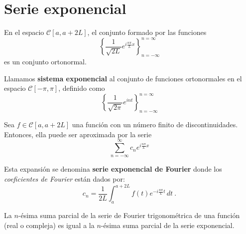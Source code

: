 \section{Serie exponencial}

\begin{propo}
    En el espacio $\mathscr{C}[a,a+2L]$, el conjunto formado por las funciones 
    \begin{equation}
        \left\{ \frac{1}{\sqrt{2L}} e^{i\frac{n\pi}{L}x} \right\}_{n= - \infty}^{n = \infty}
    \end{equation}
    es un conjunto ortonormal.
\end{propo}

\begin{defi} 
    Llamamos \textbf{sistema exponencial} al conjunto de funciones ortonormales en el espacio $\mathscr{C}[-\pi,\pi]$, definido como 
    $$\left\{ \frac{1}{\sqrt{2\pi}} e^{int} \right\}_{n= - \infty}^{n = \infty}$$
\end{defi}

\begin{defi} 
Sea $f \in \mathscr{C}[a,a+2L]$ una función con un número finito de discontinuidades. Entonces, ella puede ser aproximada por la serie 
\begin{equation}
     \sum_{n=- \infty}^{\infty} c_n e^{i\frac{n\pi}{L}x} \label{FourierExpo}
\end{equation}

Esta expansión se denomina \textbf{serie exponencial de Fourier}  donde los \textit{coeficientes de Fourier} están dados por:
\begin{equation*}
    c_n = \frac{1}{2L} \int_{a}^{a+2L} f(t) e^{-i\frac{n\pi}{L}t} \,dt \ .
\end{equation*}
\end{defi}


\begin{propo} \label{TrigoExpo}
La $n$-ésima suma parcial de la serie de Fourier trigonométrica de una función (real o compleja) es igual a la $n$-ésima suma parcial de la serie exponencial.
\end{propo}

